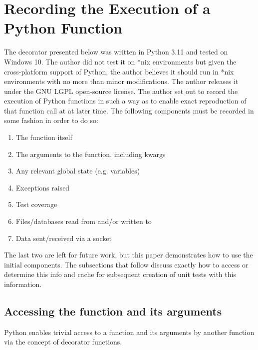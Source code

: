 \section{Recording the Execution of a Python Function}\label{sec:approach}

The decorator presented below was written in Python 3.11 and tested on 
Windows 10.  The author did not test it on *nix environments but given the
cross-platform support of Python, the author believes it should run in *nix 
environments with no more than minor modifications. The author releases it
 under the GNU LGPL open-source license.
The author set out to record the execution of Python functions
in such a way as to enable exact reproduction of that 
function call at at later time.  The following components
must be recorded in some fashion in order to do so:
\begin{enumerate}
  \item The function itself
  \item The arguments to the function, including kwargs
  \item Any relevant global state (e.g. variables)
  \item Exceptions raised
  \item Test coverage
  \item Files/databases read from and/or written to
  \item Data sent/received via a socket
\end{enumerate}

The last two are left for future work, but this paper demonstrates how to use 
the initial components. The subsections that follow discuss exactly how to 
access or determine this info and cache for subsequent creation of unit tests
with this information.
\subsection{Accessing the function and its arguments}\label{sec:approach-internal-1}

Python enables trivial access to a function and 
its arguments by another function via the concept of 
decorator functions.

